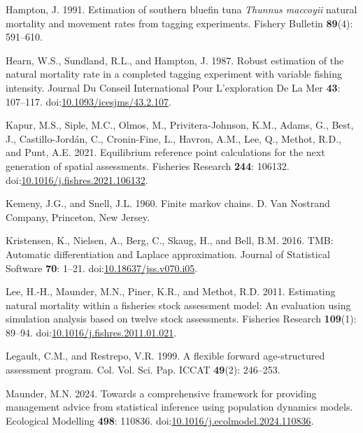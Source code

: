 \documentclass[
]{article}
\newlength{\cslhangindent}
\newlength{\cslentryspacingunit} %
\newenvironment{CSLReferences}[2] %
 {%
  \setlength{\parindent}{0pt}
  \ifodd #1
  \let\oldpar\par
  \def\par{\hangindent=\cslhangindent\oldpar}
  \fi
  \setlength{\parskip}{#2\cslentryspacingunit}
 }%
 {}
\begin{document}
\begin{CSLReferences}{1}{0}
\leavevmode{}%
Hampton, J. 1991. Estimation of southern bluefin tuna \emph{{T}hunnus
maccoyii} natural mortality and movement rates from tagging experiments.
Fishery Bulletin \textbf{89}(4): 591--610.

\leavevmode{}%
Hearn, W.S., Sundland, R.L., and Hampton, J. 1987. Robust estimation of
the natural mortality rate in a completed tagging experiment with
variable fishing intensity. Journal Du Conseil International Pour
L'exploration De La Mer \textbf{43}: 107--117.
doi:\href{https://doi.org/10.1093/icesjms/43.2.107}{10.1093/icesjms/43.2.107}.

\leavevmode{}%
Kapur, M.S., Siple, M.C., Olmos, M., Privitera-Johnson, K.M., Adams, G.,
Best, J., Castillo-Jordán, C., Cronin-Fine, L., Havron, A.M., Lee, Q.,
Methot, R.D., and Punt, A.E. 2021. Equilibrium reference point
calculations for the next generation of spatial assessments. Fisheries
Research \textbf{244}: 106132.
doi:\href{https://doi.org/10.1016/j.fishres.2021.106132}{10.1016/j.fishres.2021.106132}.

\leavevmode{}%
Kemeny, J.G., and Snell, J.L. 1960. Finite markov chains. D. Van
Nostrand Company, Princeton, New Jersey.

\leavevmode{}%
Kristensen, K., Nielsen, A., Berg, C., Skaug, H., and Bell, B.M. 2016.
{TMB}: Automatic differentiation and {Laplace} approximation. Journal of
Statistical Software \textbf{70}: 1--21.
doi:\href{https://doi.org/10.18637/jss.v070.i05}{10.18637/jss.v070.i05}.

\leavevmode{}%
Lee, H.-H., Maunder, M.N., Piner, K.R., and Methot, R.D. 2011.
Estimating natural mortality within a fisheries stock assessment model:
An evaluation using simulation analysis based on twelve stock
assessments. Fisheries Research \textbf{109}(1): 89--94.
doi:\href{https://doi.org/10.1016/j.fishres.2011.01.021}{10.1016/j.fishres.2011.01.021}.

\leavevmode{}%
Legault, C.M., and Restrepo, V.R. 1999. A flexible forward
age-structured assessment program. Col. Vol. Sci. Pap. ICCAT
\textbf{49}(2): 246--253.

\leavevmode{}%
Maunder, M.N. 2024. Towards a comprehensive framework for providing
management advice from statistical inference using population dynamics
models. Ecological Modelling \textbf{498}: 110836.
doi:\href{https://doi.org/10.1016/j.ecolmodel.2024.110836}{10.1016/j.ecolmodel.2024.110836}.


\end{CSLReferences}
\end{document}
